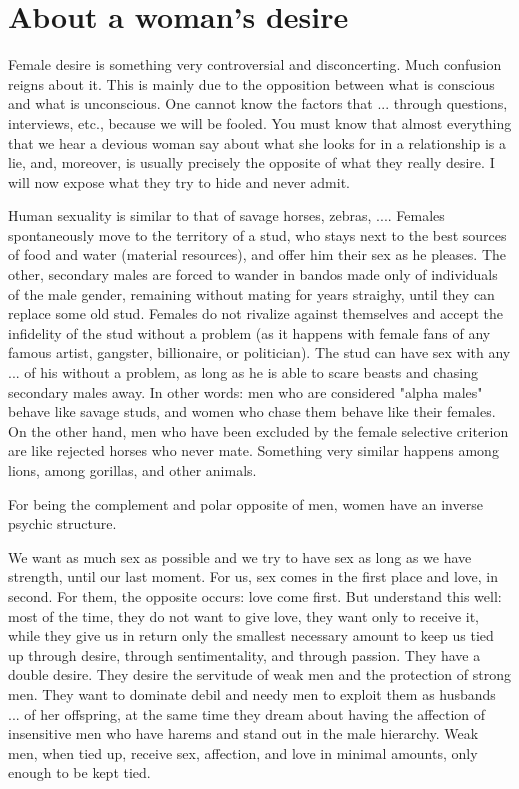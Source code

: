 \section{About a woman's desire}

\par Female desire is something very controversial and disconcerting. Much confusion reigns about it. This is mainly due to the opposition between what is conscious and what is unconscious. One cannot know the factors that ... through questions, interviews, etc., because we will be fooled. You must know that almost everything that we hear a devious woman say about what she looks for in a relationship is a lie, and, moreover, is usually precisely the opposite of what they really desire. I will now expose what they try to hide and never admit.
  
\par Human sexuality is similar to that of savage horses, zebras, .... Females spontaneously move to the territory of a stud, who stays next to the best sources of food and water (material resources), and offer him their sex as he pleases. The other, secondary males are forced to wander in bandos made only of individuals of the male gender, remaining without mating for years straighy, until they can replace some old stud. Females do not rivalize against themselves and accept the infidelity of the stud without a problem (as it happens with female fans of any famous artist, gangster, billionaire, or politician). The stud can have sex with any ... of his without a problem, as long as he is able to scare beasts and chasing secondary males away. In other words: men who are considered "alpha males" behave like savage studs, and women who chase them behave like their females. On the other hand, men who have been excluded by the female selective criterion are like rejected horses who never mate. Something very similar happens among lions, among gorillas, and other animals.
  
\par For being the complement and polar opposite of men, women have an inverse psychic structure.
  
\par We want as much sex as possible and we try to have sex as long as we have strength, until our last moment. For us, sex comes in the first place and love, in second. For them, the opposite occurs: love come first. But understand this well: most of the time, they do not want to give love, they want only to receive it, while they give us in return only the smallest necessary amount to keep us tied up through desire, through sentimentality, and through passion. They have a double desire. They desire the servitude of weak men and the protection of strong men. They want to dominate debil and needy men to exploit them as husbands ... of her offspring, at the same time they dream about having the affection of insensitive men who have harems and stand out in the male hierarchy. Weak men, when tied up, receive sex, affection, and love in minimal amounts, only enough to be kept tied.
  
